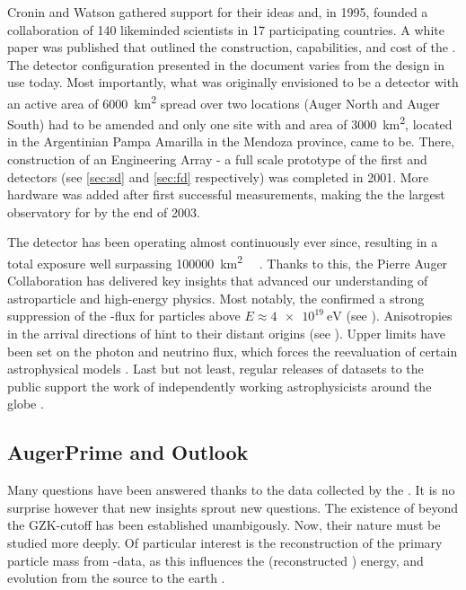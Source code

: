 Cronin and Watson gathered support for their ideas and, in 1995, founded a 
collaboration of 140 likeminded scientists in 17 participating countries. A 
white paper was published that outlined the construction, capabilities, and 
cost of the \PAO \cite{thepierreaugercollaborationPierreAugerObservatory1997}. 
The detector configuration presented in the document varies from the design in 
use today. Most importantly, what was originally envisioned to be a detector 
with an active area of \SI{6000}{\km\squared} spread over two locations (Auger 
North and Auger South) had to be amended and only one site with and area of 
\SI{3000}{\km\squared}, located in the Argentinian Pampa Amarilla in the 
Mendoza province, came to be. There, construction of an Engineering Array - a 
full scale prototype of the first \SD and \FD detectors (see \cref{sec:sd} and 
\cref{sec:fd} respectively) was completed in 2001. More hardware was added 
after first successful measurements, making the \PAO the largest observatory 
for \CRs by the end of 2003.

The detector has been operating almost continuously ever since, resulting in a 
total exposure well surpassing \SI{100000}{\km\squared\sr\year} 
\cite{aabPierreAugerObservatory2020}. Thanks to this, the Pierre Auger 
Collaboration has delivered key insights that advanced our understanding of 
astroparticle and high-energy physics. Most notably, the \PAO confirmed a 
strong suppression of the \CR-flux for particles above 
$E\approx\SI{4e19}{\eV}$ \cite{yamamotoUHECRSpectrumMeasured2007} (see 
). Anisotropies in the arrival directions of \UHECRs 
hint to their distant origins
\cite{thepierreaugercollaborationObservationLargescaleAnisotropy2017} (see 
). Upper limits have been set on the \UHE photon and
neutrino flux, which forces the reevaluation of certain astrophysical models 
\cite{collaborationPierreAugerObservatory2011, abreuSearchUltrahighEnergy2011}.
Last but not least, regular releases of datasets to the public support the work 
of independently working astrophysicists around the globe 
\cite{pierreaugercollaborationPierreAugerObservatory2025}.

\subsection{AugerPrime and Outlook}
\label{ssec:augerprime-and-outlook}

Many questions have been answered thanks to the data collected by the \PAO. It
is no surprise however that new insights sprout new questions. The existence of
\UHECRs beyond the GZK-cutoff has been established unambigously. Now, their
nature must be studied more deeply. Of particular interest is the 
reconstruction of the primary particle mass from \EAS-data, as this influences 
the \CRs (reconstructed \cite{yushkovMassCompositionCosmic2021}) energy, and 
evolution from the source to the earth 
\cite{strongCosmicRayPropagationInteractions2007, 
flaggsStudyingMassSensitivity2024}.

